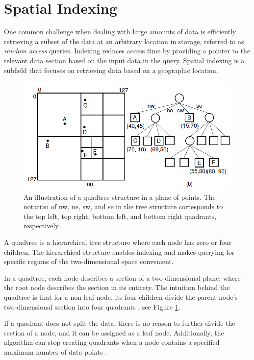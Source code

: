 \section{Spatial Indexing}
One common challenge when dealing with large amounts of data is efficiently retrieving a subset of the data at an arbitrary location in storage, referred to as \emph{random access} queries. Indexing reduces access time by providing a pointer to the relevant data section based on the input data in the query. Spatial indexing is a subfield that focuses on retrieving data based on a geographic location.
\begin{figure}[h]
    \centering
    \includegraphics[width=12cm]{images/Point_quadtree.png}
    \caption{An illustration of a quadtree structure in a plane of points. The notation of nw, ne, sw, and se in the tree structure corresponds to the top left, top right, bottom left, and bottom right quadrants, respectively \cite[Figure~13.6]{huffman_tree_img}.} %
    \label{img:quad}
\end{figure}
A quadtree is a hierarchical tree structure where each node has zero or four children. The hierarchical structure enables indexing and makes querying for specific regions of the two-dimensional space convenient.

In a quadtree, each node describes a section of a two-dimensional plane, where the root node describes the section in its entirety. The intuition behind the quadtree is that for a non-leaf node, its four children divide the parent node's two-dimensional section into four quadrants \cite{10.1145/356924.356930}, see Figure \ref{img:quad}.

If a quadrant does not split the data, there is no reason to further divide the section of a node, and it can be assigned as a leaf node. Additionally, the algorithm can stop creating quadrants when a node contains a specified maximum number of data points \cite{10.1145/356924.356930}.

